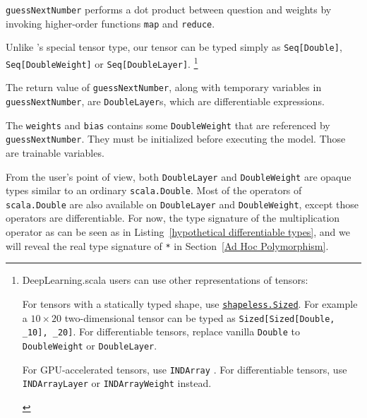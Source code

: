 \lstinline{guessNextNumber} performs a dot product between question and weights by invoking higher-order functions \lstinline{map} and \lstinline{reduce}. 

Unlike \cite{chen2017typesafe}'s special tensor type, our tensor can be typed simply as \lstinline{Seq[Double]}, \lstinline{Seq[DoubleWeight]} or \lstinline{Seq[DoubleLayer]}.
\footnote{DeepLearning.scala users can use other representations of tensors:
\begin{enumerate*}
  \item For tensors with a statically typed shape, use \href{https://javadoc.io/page/com.chuusai/shapeless_2.11/latest/shapeless/Sized.html}{ \lstinline{shapeless.Sized}}. For example a $10\times20$ two-dimensional tensor can be typed as \lstinline{Sized[Sized[Double, _10], _20]}. For differentiable tensors, replace vanilla \lstinline{Double} to \lstinline{DoubleWeight} or \lstinline{DoubleLayer}.
  \item For GPU-accelerated tensors, use \lstinline{INDArray} \cite{skymind2017nd4j}. For differentiable tensors, use \lstinline{INDArrayLayer} or \lstinline{INDArrayWeight} instead.
\end{enumerate*}
}

The return value of \lstinline{guessNextNumber}, along with temporary variables in \lstinline{guessNextNumber}, are \lstinline{DoubleLayer}s, which are \glspl{differentiable expression}.

The \lstinline{weights} and \lstinline{bias} contains some \lstinline{DoubleWeight} that are referenced by \lstinline{guessNextNumber}.
They must be initialized before executing the model. Those are \glspl{trainable variable}.

From the user's point of view, both \lstinline{DoubleLayer} and \lstinline{DoubleWeight} are opaque types similar to an ordinary \lstinline{scala.Double}. Most of the operators of \lstinline{scala.Double} are also available on \lstinline{DoubleLayer}  and \lstinline{DoubleWeight}, except those operators are differentiable. For now, the type signature of the multiplication operator as can be seen as in Listing~\ref{hypothetical differentiable types}, and we will reveal the real type signature of \lstinline{*} in Section~\ref{Ad Hoc Polymorphism}.

